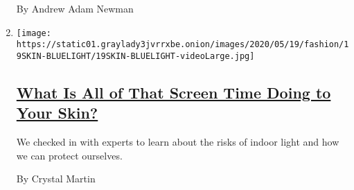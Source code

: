\begin{enumerate}
  By Andrew Adam Newman
\item
  \texttt{[image: https://static01.graylady3jvrrxbe.onion/images/2020/05/19/fashion/19SKIN-BLUELIGHT/19SKIN-BLUELIGHT-videoLarge.jpg]}

  \hypertarget{what-is-all-of-that-screen-time-doing-to-your-skin}{%
  \subsection{\texorpdfstring{\href{/2020/05/20/style/skin-damage-blue-light-what-is-all-of-that-screen-time-doing-to-your-skin.html}{What
  Is All of That Screen Time Doing to Your
  Skin?}}{What Is All of That Screen Time Doing to Your Skin?}}\label{what-is-all-of-that-screen-time-doing-to-your-skin}}

  We checked in with experts to learn about the risks of indoor light
  and how we can protect ourselves.

  By Crystal Martin
\end{enumerate}

